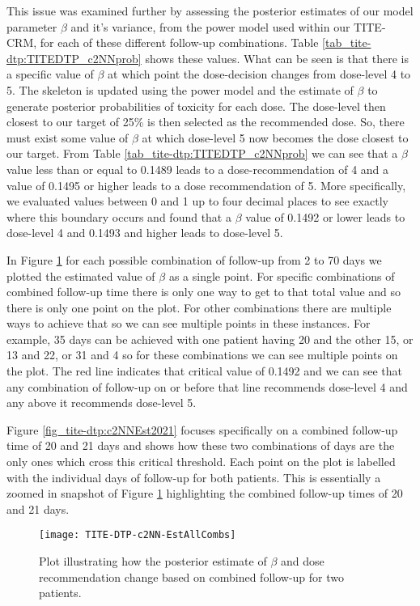 This issue was examined further by assessing the posterior estimates of our model parameter $\beta$ and it's variance, from the power model used within our TITE-CRM, for each of these different follow-up combinations. Table \ref{tab_tite-dtp:TITEDTP_c2NNprob} shows these values. What can be seen is that there is a specific value of $\beta$ at which point the dose-decision changes from dose-level 4 to 5. The skeleton is updated using the power model and the estimate of $\beta$ to generate posterior probabilities of toxicity for each dose. The dose-level then closest to our target of 25\% is then selected as the recommended dose. So, there must exist some value of $\beta$ at which dose-level 5 now becomes the dose closest to our target. From Table \ref{tab_tite-dtp:TITEDTP_c2NNprob} we can see that a $\beta$ value less than or equal to 0.1489 leads to a dose-recommendation of 4 and a value of 0.1495 or higher leads to a dose recommendation of 5. More specifically, we evaluated values between 0 and 1 up to four decimal places to see exactly where this boundary occurs and found that a $\beta$ value of 0.1492 or lower leads to dose-level 4 and 0.1493 and higher leads to dose-level 5. 

In Figure \ref{fig_tite-dtp:c2NNEstAllCombs} for each possible combination of follow-up from 2 to 70 days we plotted the estimated value of $\beta$ as a single point. For specific combinations of combined follow-up time there is only one way to get to that total value and so there is only one point on the plot. For other combinations there are multiple ways to achieve that so we can see multiple points in these instances. For example, 35 days can be achieved with one patient having 20 and the other 15, or 13 and 22, or 31 and 4 so for these combinations we can see multiple points on the plot. The red line indicates that critical value of 0.1492 and we can see that any combination of follow-up on or before that line recommends dose-level 4 and any above it recommends dose-level 5. 

Figure \ref{fig_tite-dtp:c2NNEst2021} focuses specifically on a combined follow-up time of 20 and 21 days and shows how these two combinations of days are the only ones which cross this critical threshold. Each point on the plot is labelled with the individual days of follow-up for both patients. This is essentially a zoomed in snapshot of Figure \ref{fig_tite-dtp:c2NNEstAllCombs} highlighting the combined follow-up times of 20 and 21 days. 

\begin{figure}[h!]
	\centering
	\caption[Changes in $\beta$ based on combined follow-up for two patients.]{Plot illustrating how the posterior estimate of $\beta$ and dose recommendation change based on combined follow-up for two patients.}
	\label{fig_tite-dtp:c2NNEstAllCombs}
	\texttt{[image: TITE-DTP-c2NN-EstAllCombs]}
\end{figure}

